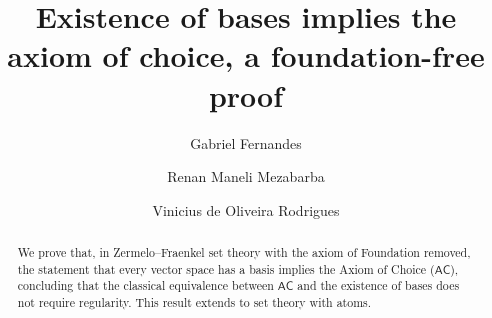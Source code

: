 \documentclass[11pt,a4paper]{amsart}
\title[Vector space bases without Foundation]
{Existence of bases implies the axiom of choice, a foundation-free proof}
\author{Gabriel Fernandes}
\author{Renan Maneli Mezabarba}
\author{Vinicius de Oliveira Rodrigues}
\date{}
\newcommand{\AC}{\mathsf{AC}}
\theoremstyle{definition}
\theoremstyle{remark}
\begin{document}
\begin{abstract}
We prove that, in Zermelo--Fraenkel set theory with the axiom of
Foundation removed, the statement that every vector space has a basis implies the Axiom of Choice ($\AC$), concluding that the classical equivalence between $\AC$ and the existence of bases does not require regularity.
This result extends to set theory with atoms.
\end{abstract}

\maketitle









\printbibliography
\end{document}
